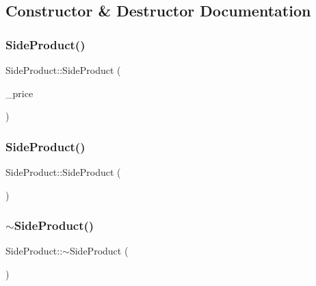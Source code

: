 \subsection{Constructor \& Destructor Documentation}
\mbox{\label{classSideProduct_a78f9a12ca66e9a65a6a689e3dbb34d66}} 
\subsubsection{\texorpdfstring{SideProduct()}{SideProduct()}\hspace{0.1cm}{\footnotesize\ttfamily [1/2]}}
{\footnotesize\ttfamily Side\+Product\+::\+Side\+Product (\begin{DoxyParamCaption}\item[{int}]{\+\_\+price }\end{DoxyParamCaption})}

\mbox{\label{classSideProduct_a6ee21911446be5c97997d8b2b64fc80b}} 
\subsubsection{\texorpdfstring{SideProduct()}{SideProduct()}\hspace{0.1cm}{\footnotesize\ttfamily [2/2]}}
{\footnotesize\ttfamily Side\+Product\+::\+Side\+Product (\begin{DoxyParamCaption}\item[{const \mbox{\hyperlink{classSideProduct}{Side\+Product}} \&}]{ }\end{DoxyParamCaption})}

\mbox{\label{classSideProduct_a9a54de9d2c9da9ca6ab416f7ae50e75d}} 
\subsubsection{\texorpdfstring{$\sim$SideProduct()}{~SideProduct()}}
{\footnotesize\ttfamily Side\+Product\+::$\sim$\+Side\+Product (\begin{DoxyParamCaption}{ }\end{DoxyParamCaption})}




